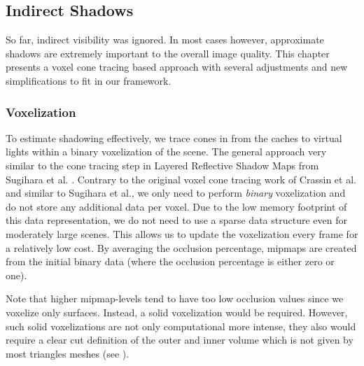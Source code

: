 \documentclass[thesis.tex]{subfiles}
\begin{document}
\subsection{Indirect Shadows}
So far, indirect visibility was ignored.
In most cases however, approximate shadows are extremely important to the overall image quality. 
This chapter presents a voxel cone tracing based approach with several adjustments and new simplifications to fit in our framework.

\subsubsection{Voxelization}
To estimate shadowing effectively, we trace cones in from the caches to virtual lights within a binary voxelization of the scene.
The general approach very similar to the cone tracing step in \cite{bib:layeredrsm} Layered Reflective Shadow Maps from Sugihara et al. \cite{bib:layeredrsm}.
Contrary to the original voxel cone tracing work of Crassin et al. \cite{bib:voxelconetracing} and similar to Sugihara et al., we only need to perform \emph{binary} voxelization and do not store any additional data per voxel.
Due to the low memory footprint of this data representation, we do not need to use a sparse data structure even for moderately large scenes.
This allows us to update the voxelization every frame for a relatively low cost.
By averaging the occlusion percentage, mipmaps are created from the initial binary data (where the occlusion percentage is either zero or one).

Note that higher mipmap-levels tend to have too low occlusion values since we voxelize only surfaces.
Instead, a solid voxelization would be required.
However, such solid voxelizations are not only computational more intense, they also would require a clear cut definition of the outer and inner volume which is not given by most triangles meshes (see ).
\end{document}
